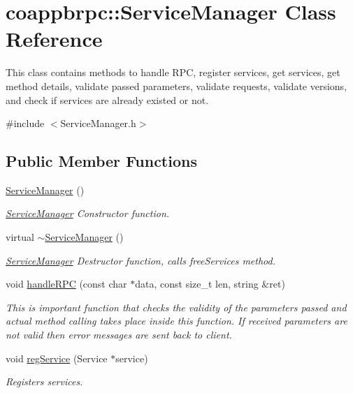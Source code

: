 \hypertarget{classcoappbrpc_1_1ServiceManager}{}\section{coappbrpc\+:\+:Service\+Manager Class Reference}
\label{classcoappbrpc_1_1ServiceManager}


This class contains methods to handle R\+PC, register services, get services, get method details, validate passed parameters, validate requests, validate versions, and check if services are already existed or not.  




{\ttfamily \#include $<$Service\+Manager.\+h$>$}

\subsection*{Public Member Functions}
\begin{DoxyCompactItemize}
\item 
\mbox{\label{classcoappbrpc_1_1ServiceManager_a7d88663a8d839cf80c3e4942346fa48f}} 
\hyperlink{classcoappbrpc_1_1ServiceManager_a7d88663a8d839cf80c3e4942346fa48f}{Service\+Manager} ()
\begin{DoxyCompactList}\small\item\em \hyperlink{classcoappbrpc_1_1ServiceManager}{Service\+Manager} Constructor function. \end{DoxyCompactList}\item 
\mbox{\label{classcoappbrpc_1_1ServiceManager_a051a08030f0df597217ce33627efce37}} 
virtual \hyperlink{classcoappbrpc_1_1ServiceManager_a051a08030f0df597217ce33627efce37}{$\sim$\+Service\+Manager} ()
\begin{DoxyCompactList}\small\item\em \hyperlink{classcoappbrpc_1_1ServiceManager}{Service\+Manager} Destructor function, calls free\+Services method. \end{DoxyCompactList}\item 
void \hyperlink{classcoappbrpc_1_1ServiceManager_a13dd031e5d5f6f22af9cbead44ed1db1}{handle\+R\+PC} (const char $\ast$data, const size\+\_\+t len, string \&ret)
\begin{DoxyCompactList}\small\item\em This is important function that checks the validity of the parameters passed and actual method calling takes place inside this function. If received parameters are not valid then error messages are sent back to client. \end{DoxyCompactList}\item 
void \hyperlink{classcoappbrpc_1_1ServiceManager_ace94f3f9fbbabc2b1ce23d4267bbfa71}{reg\+Service} (Service $\ast$service)
\begin{DoxyCompactList}\small\item\em Registers services. \end{DoxyCompactList}\end{DoxyCompactItemize}


